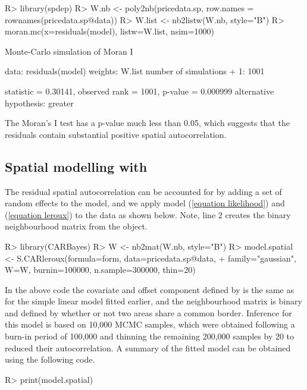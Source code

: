 \documentclass[article,shortnames,nojss]{jss}
\begin{document}
\begin{Schunk}
\begin{Sinput}
R> library(spdep)
R> W.nb <- poly2nb(pricedata.sp, row.names = rownames(pricedata.sp@data))
R> W.list <- nb2listw(W.nb, style="B")
R> moran.mc(x=residuals(model), listw=W.list, nsim=1000)
\end{Sinput}
\begin{Soutput}
	Monte-Carlo simulation of Moran I

data:  residuals(model) 
weights: W.list  
number of simulations + 1: 1001 

statistic = 0.30141, observed rank = 1001, p-value = 0.000999
alternative hypothesis: greater
\end{Soutput}
\end{Schunk}
    
    
The Moran's I test has  a p-value much less than 0.05, which suggests that the residuals contain substantial positive spatial autocorrelation.


\subsection[Spatial modelling with CARBayes]{Spatial modelling with }
The residual spatial autocorrelation can be accounted for by adding a set of random effects to the model, and we apply model (\ref{equation likelihood}) and  (\ref{equation leroux}) to the data as shown below. Note, line 2 creates the binary neighbourhood matrix  from the  object.


\begin{CodeInput}
R> library(CARBayes)
R> W <- nb2mat(W.nb, style="B")
R> model.spatial <- S.CARleroux(formula=form, data=pricedata.sp@data, 
+   family="gaussian", W=W, burnin=100000, n.sample=300000, thin=20)
\end{CodeInput}

In the above code the covariate and offset component defined by  is the same as for the simple linear model fitted earlier, and the neighbourhood matrix  is binary and defined by whether or not two areas share a common border. Inference for this model is based on 10,000 MCMC samples, which were obtained following a burn-in period of 100,000 and thinning the remaining 200,000 samples by 20 to reduced their autocorrelation. A summary of the fitted model can be obtained using the following code.

\begin{CodeInput}
R> print(model.spatial)
\end{CodeInput}
\end{document}
